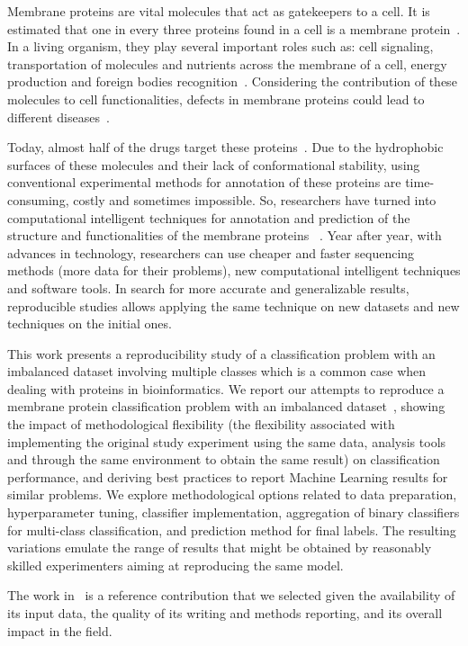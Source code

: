 Membrane proteins are vital molecules that act as gatekeepers to a cell. 
It is estimated that one in every three proteins found in a cell is a membrane 
protein~\cite{cell2016Membranes}.  In a living organism, they play several important roles such as: 
cell signaling,  transportation of  molecules and nutrients across the membrane of a cell, 
energy production and foreign bodies recognition~\cite{kozma2012pdbtm}. Considering the contribution of 
these molecules to cell functionalities, defects in membrane proteins could lead to 
different diseases~\cite{gromiha2014bioinformatics}. 

Today, almost half of the drugs target these proteins~\cite{butt2017treatise}. 
Due to the hydrophobic surfaces of these molecules and their lack of conformational stability, 
using conventional experimental methods for annotation of these proteins are time-consuming, 
costly and sometimes impossible. So, researchers have turned into computational 
intelligent techniques for annotation and prediction of the structure and functionalities of the membrane proteins
~\cite{gromiha2006discrimination,gromiha2008functional,ou2010classification,schaadt2012functional,butt2016prediction}. 
Year after year, with advances in technology, researchers can use cheaper and 
faster sequencing methods (more data for their problems), new computational intelligent 
techniques and software tools. In search for more accurate and generalizable results, 
reproducible studies allows applying the same technique on new datasets and new techniques 
on the initial ones.

This work presents a reproducibility study of a classification problem with an imbalanced dataset 
involving multiple classes which is a common case when dealing with proteins in bioinformatics. 
We report our attempts to reproduce a membrane protein classification problem with an imbalanced 
dataset~\cite{mishra_prediction_2014}, showing the impact of methodological
flexibility (the flexibility associated with implementing the original study experiment 
using the same data, analysis tools and through the same environment to obtain the same result)
on classification performance, and deriving best practices to
report Machine Learning results for similar problems. We explore
methodological options related to data preparation, hyperparameter tuning,
classifier implementation, aggregation of binary classifiers for
multi-class classification, and prediction method for final labels. The
resulting variations emulate the range of results that might be obtained by
reasonably skilled experimenters aiming at reproducing the same model.

The work in~\cite{mishra_prediction_2014}
is a reference contribution that we selected given
the availability of its input data, the quality of its writing and methods
reporting, and its overall impact in the field. 